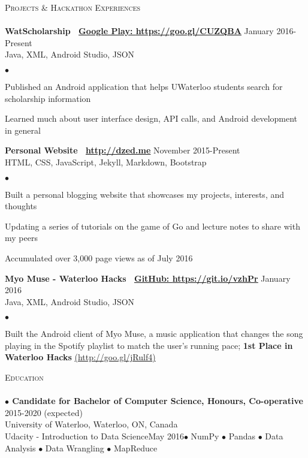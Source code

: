 \documentclass{article}
\newcommand{\lineunder}{\vspace*{-8pt} \\ \hspace*{-18pt} \hrulefill \\}
\newcommand{\header}[1]{{\hspace*{-15pt}\vspace*{6pt} \textsc{#1}} \vspace*{-6pt} \lineunder}
\newcommand{\employer}[3]{{ \textbf{#1} \hfill #2\\ {#3}\\  }}
\newenvironment{achievements}{\begin{list}{$\bullet$}{\topsep 0pt \itemsep -2pt}}{\vspace*{4pt}\end{list}}
\newcommand{\schoolwithcourses}[4]{
 \hspace{12pt} \textbf{$\bullet$ \hspace{2bp}#1} \hfill{#2}\\ \hspace{25pt}#3\\ 
\vspace*{5pt}
}
\begin{document}
\header{Projects \& Hackathon Experiences}

\employer{WatScholarship \hspace{5pt} \Mundus~\href{https://goo.gl/CUZQBA}{Google Play: \underline{https://goo.gl/CUZQBA}}}{January 2016-Present}{Java, XML, Android Studio, JSON}
	\begin{achievements}
	\item Published an Android application that helps UWaterloo students search for scholarship information
	\item Learned much about user interface design, API calls, and Android development in general
	\end{achievements}
	
\employer{Personal Website \hspace{5pt} \Mundus~\href{http://dzed.me}{\underline{http://dzed.me}}}{November 2015-Present}{HTML, CSS, JavaScript, Jekyll, Markdown, Bootstrap}
	\begin{achievements}
	\item Built a personal blogging website that showcases my projects, interests, and thoughts
	\item Updating a series of tutorials on the game of Go and lecture notes to share with my peers
	\item Accumulated over 3,000 page views as of July 2016
	\end{achievements}

\employer{Myo Muse - Waterloo Hacks \hspace{5pt} \Mundus~\href{https://git.io/vzhPr}{GitHub: \underline{https://git.io/vzhPr}}}{January 2016}{Java, XML, Android Studio, JSON}
	\begin{achievements}
	\item Built the Android client of Myo Muse, a music application that changes the song playing in the Spotify playlist to match the user's running pace; \textbf{1st Place in Waterloo Hacks} \href{http://goo.gl/jRulf4}{(\underline{http://goo.gl/jRulf4})}
	\end{achievements}

\header{Education}

\schoolwithcourses{Candidate for Bachelor of Computer Science, Honours, Co-operative}{2015-2020 (expected)}{University of Waterloo, Waterloo, ON, Canada}

\schoolwithcourses{Udacity - Introduction to Data Science}{May 2016}{$\bullet$ NumPy $\bullet$ Pandas $\bullet$ Data Analysis $\bullet$ Data Wrangling $\bullet$ MapReduce}
\end{document}
